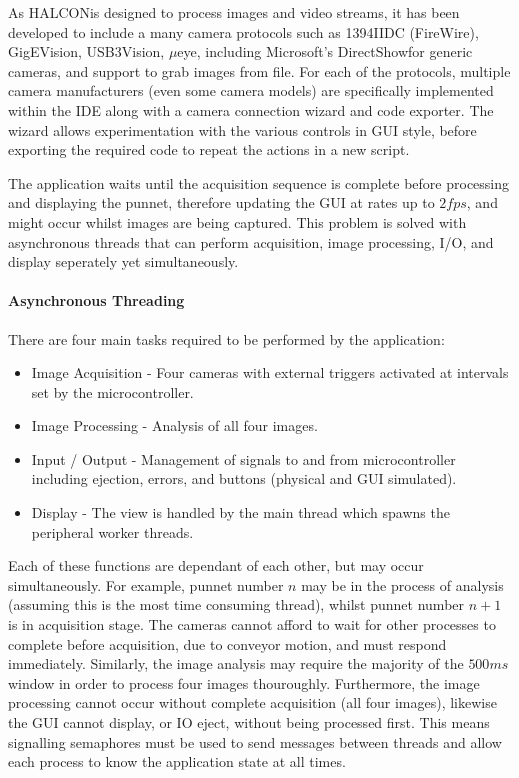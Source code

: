 \documentclass[fleqn,twoside]{article}
\begin{document}
As HALCON\texttrademark is designed to process images and video streams, it has been developed to include a many camera protocols such as 1394IIDC (FireWire\texttrademark), GigEVision\textregistered, USB3Vision\textregistered, $\mu$eye\texttrademark, including Microsoft\textregistered's DirectShow\textregistered for generic cameras, and support to grab images from file. For each of the protocols, multiple camera manufacturers (even some camera models) are specifically implemented within the IDE along with a camera connection wizard and code exporter. The wizard allows experimentation with the various controls in GUI style, before exporting the required code to repeat the actions in a new script. 

The application waits until the acquisition sequence is complete before processing and displaying the punnet, therefore updating the GUI at rates up to $2fps$, and might occur whilst images are being captured. This problem is solved with asynchronous threads that can perform acquisition, image processing, I/O, and display seperately yet simultaneously.


\paragraph{Asynchronous Threading}

There are four main tasks required to be performed by the application:


\begin{itemize}
	\item Image Acquisition - Four cameras with external triggers activated at intervals set by the microcontroller.
	\item Image Processing - Analysis of all four images.
	\item Input / Output - Management of signals to and from microcontroller including ejection, errors, and buttons (physical and GUI simulated).
	\item Display - The view is handled by the main thread which spawns the peripheral worker threads.
\end{itemize}


Each of these functions are dependant of each other, but may occur simultaneously. For example, punnet number $n$ may be in the process of analysis (assuming this is the most time consuming thread), whilst punnet number $n+1$ is in acquisition stage. The cameras cannot afford to wait for other processes to complete before acquisition, due to conveyor motion, and must respond immediately. Similarly, the image analysis may require the majority of the $500ms$ window in order to process four images thouroughly. Furthermore, the image processing cannot occur without complete acquisition (all four images), likewise the GUI cannot display, or IO eject, without being processed first. This means signalling semaphores must be used to send messages between threads and allow each process to know the application state at all times.
\end{document}
